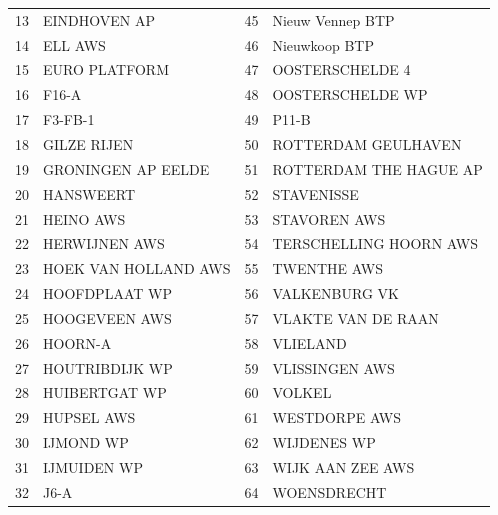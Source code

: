 \begin{longtable}{p{}p{}p{}p{}}
    13  & EINDHOVEN AP          & 45  & Nieuw Vennep BTP                                      \\
    14  & ELL AWS               & 46  & Nieuwkoop BTP                                         \\
    15  & EURO PLATFORM         & 47  & OOSTERSCHELDE 4                                       \\
    16  & F16-A                 & 48  & OOSTERSCHELDE WP                                      \\
    17  & F3-FB-1               & 49  & P11-B                                                 \\
    18  & GILZE RIJEN           & 50  & ROTTERDAM GEULHAVEN                                   \\
    19  & GRONINGEN AP EELDE    & 51  & ROTTERDAM THE HAGUE AP                                \\
    20  & HANSWEERT             & 52  & STAVENISSE                                            \\
    21  & HEINO AWS             & 53  & STAVOREN AWS                                          \\
    22  & HERWIJNEN AWS         & 54  & TERSCHELLING HOORN AWS                                \\
    23  & HOEK VAN HOLLAND AWS  & 55  & TWENTHE AWS                                           \\
    24  & HOOFDPLAAT WP         & 56  & VALKENBURG VK                                         \\
    25  & HOOGEVEEN AWS         & 57  & VLAKTE VAN DE RAAN                                    \\
    26  & HOORN-A               & 58  & VLIELAND                                              \\
    27  & HOUTRIBDIJK WP        & 59  & VLISSINGEN AWS                                        \\
    28  & HUIBERTGAT WP         & 60  & VOLKEL                                                \\
    29  & HUPSEL AWS            & 61  & WESTDORPE AWS                                         \\
    30  & IJMOND WP             & 62  & WIJDENES WP                                           \\
    31  & IJMUIDEN WP           & 63  & WIJK AAN ZEE AWS                                      \\
    32  & J6-A                  & 64  & WOENSDRECHT                                           \\
\end{longtable}